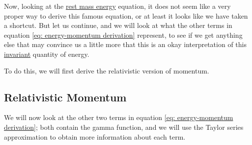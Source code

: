 Now, looking at the \hyperlink{def-rest-mass-energy}{rest mass energy} equation, it does not seem like a very proper way to derive this famous equation, or at least it looks like we have taken a shortcut.
But let us continue, and we will look at what the other terms in equation \eqref{eq: energy-momentum derivation} represent, to see if we get anything else that may convince us a little more that this is an okay interpretation of this \hyperlink{def-lorentz-invariant}{invariant} quantity of energy.

To do this, we will first derive the relativistic version of momentum.

\subsection{Relativistic Momentum}\label{subsect: Relativistic Momentum}

We will now look at the other two terms in equation \eqref{eq: energy-momentum derivation}; both contain the gamma function, and we will use the Taylor series approximation to obtain more information about each term.

